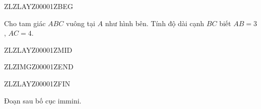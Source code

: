 \documentclass[12pt]{article}
\begin{document}
ZLZLAYZ00001ZBEG

Cho tam giác $ABC$ vuông tại $A$ như hình bên. Tính độ dài cạnh $BC$ biết $AB=3$, $AC=4$.

ZLZLAYZ00001ZMID




ZLZIMGZ00001ZEND



ZLZLAYZ00001ZFIN



Đoạn sau bố cục immini.
\end{document}
